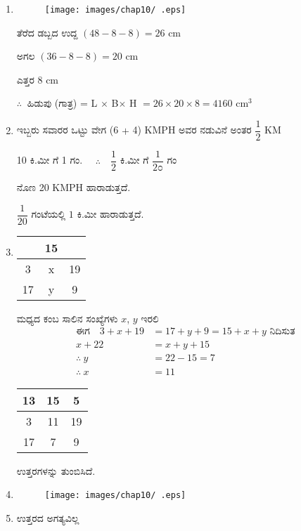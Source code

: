 \begin{enumerate}
\item
\begin{figure}[!h]
\centering
\texttt{[image: images/chap10/ .eps]}
\end{figure} 

ತೆರೆದ ಡಬ್ಬದ ಉದ್ದ $(48 - 8 - 8) = 26$ cm

ಅಗಲ $(36 - 8 - 8) = 20$ cm

ಎತ್ತರ $8$ cm

$\therefore~$ ಹಿಡುಪು (ಗಾತ್ರ) = L $\times$  B$\times$ H $= 26\times 20\times 8 = 4160$ cm$^{3}$

\item  ಇಬ್ಬರು ಸವಾರರ ಒಟ್ಟು ವೇಗ (6 $+$ 4) KMPH ಅವರ ನಡುವಿನೆ ಅಂತರ $\dfrac{1}{2}$ KM

10 ಕಿ.ಮೀ ಗೆ  1 ಗಂ. $\quad\therefore\quad \dfrac{1}{2}$ ಕಿ.ಮೀ ಗೆ $\dfrac{1}{2೦}$ ಗಂ 

ನೊಣ 20 KMPH ಹಾರಾಡುತ್ತದೆ. 

$\dfrac{1}{20}$ ಗಂಟೆಯಲ್ಲಿ $1$ ಕಿ.ಮೀ ಹಾರಾಡುತ್ತದೆ. 

\item 
\begin{tabular}[t]{|c|c|c|}
 \hline
 & 15 & \\
 \hline
 3 & x & 19\\
 \hline
 17 & y & 9\\
 \hline
\end{tabular}

ಮಧ್ಯದ ಕಂಬ ಸಾಲಿನ ಸಂಖ್ಯೆಗಳು $x$, $y$ ಇರಲಿ 
\begin{align*}
\text{ಈಗ}\quad 3 + x + 19 & = 17 + y + 9 = 15 + x + y \text{ ನಿದಿಸುತ} \\
x + 22 & = x + y + 15\\
\therefore~ y & = 22 - 15 = 7\\
\therefore~ x & = 11
\end{align*}
\begin{tabular}[t]{|c|c|c|}
 \hline
 13 & 15 & 5\\
 \hline
 3 & 11 & 19\\
 \hline
 17 & 7 & 9\\
 \hline
\end{tabular}

ಉತ್ತರಗಳನ್ನು ತುಂಬಿಸಿದೆ. 

\item 
\begin{figure}[!h]
\centering
\texttt{[image: images/chap10/ .eps]}
\end{figure}

\item ಉತ್ತರದ ಅಗತ್ಯವಿಲ್ಲ 


\end{enumerate}
